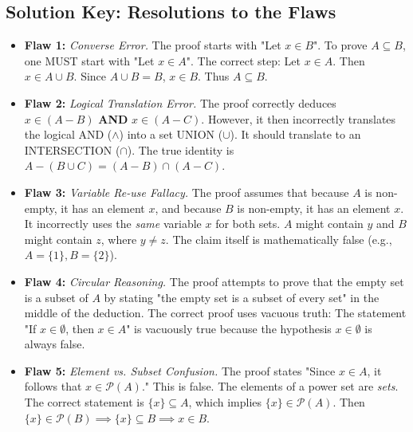\documentclass[11pt]{article}
\theoremstyle{definition}
\theoremstyle{remark}
\begin{document}
\subsection*{Solution Key: Resolutions to the Flaws}
\begin{itemize}
    \item \textbf{Flaw 1:} \textit{Converse Error.} The proof starts with "Let $x \in B$". To prove $A \subseteq B$, one MUST start with "Let $x \in A$". The correct step: Let $x \in A$. Then $x \in A \cup B$. Since $A \cup B = B$, $x \in B$. Thus $A \subseteq B$.
    \item \textbf{Flaw 2:} \textit{Logical Translation Error.} The proof correctly deduces $x \in (A - B)$ \textbf{AND} $x \in (A - C)$. However, it then incorrectly translates the logical AND ($\land$) into a set UNION ($\cup$). It should translate to an INTERSECTION ($\cap$). The true identity is $A - (B \cup C) = (A - B) \cap (A - C)$.
    \item \textbf{Flaw 3:} \textit{Variable Re-use Fallacy.} The proof assumes that because $A$ is non-empty, it has an element $x$, and because $B$ is non-empty, it has an element $x$. It incorrectly uses the \textit{same} variable $x$ for both sets. $A$ might contain $y$ and $B$ might contain $z$, where $y \neq z$. The claim itself is mathematically false (e.g., $A=\{1\}, B=\{2\}$).
    \item \textbf{Flaw 4:} \textit{Circular Reasoning.} The proof attempts to prove that the empty set is a subset of $A$ by stating "the empty set is a subset of every set" in the middle of the deduction. The correct proof uses vacuous truth: The statement "If $x \in \emptyset$, then $x \in A$" is vacuously true because the hypothesis $x \in \emptyset$ is always false.
    \item \textbf{Flaw 5:} \textit{Element vs. Subset Confusion.} The proof states "Since $x \in A$, it follows that $x \in \mathcal{P}(A)$." This is false. The elements of a power set are \textit{sets}. The correct statement is $\{x\} \subseteq A$, which implies $\{x\} \in \mathcal{P}(A)$. Then $\{x\} \in \mathcal{P}(B) \implies \{x\} \subseteq B \implies x \in B$.
\end{itemize}
\end{document}
